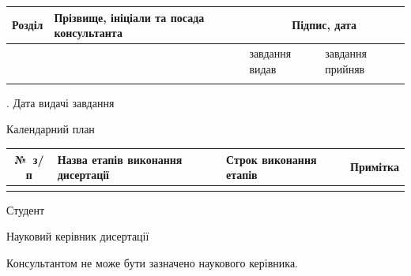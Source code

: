 \begin{center}
  \begin{tabularx}{\textwidth}{|X|X|X|X|}
    \hline
    Розділ & Прізвище, ініціали та посада консультанта &
      \multicolumn{2}{c|}{Підпис, дата} \\
    \hline
    & & завдання видав & завдання прийняв \\
    \hline
    & & & \\
    \hline
  \end{tabularx}
\end{center}

. Дата видачі завдання \hrulefill

\begin{center}
  Календарний план
\end{center}

\begin{center}
  \begin{tabularx}{\textwidth}{|c|X|X|X|}
    \hline
    №~з/п & Назва етапів виконання дисертації &
      Строк виконання етапів & Примітка \\
    \hline
    & & & \\
    \hline
  \end{tabularx}
\end{center}

\vspace{1em}
\noindent Студент \hfill \authorFullName

\noindent Науковий керівник дисертації \hfill \supervisorFullName

\vspace{1em}
{\small * Консультантом не може бути зазначено наукового керівника.}

\clearpage
